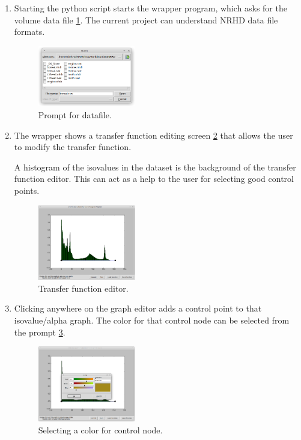 \documentclass[letterpaper,11pt]{report}
\begin{document}
\begin{enumerate}
    \item
    Starting the python script starts the wrapper program, which asks for the volume data file \ref{fig:working1}. The current project can understand NRHD data file formats.

    \begin{figure}[h!]
     \centering
      \includegraphics[width=0.4\textwidth]{working1.png}
      \caption{Prompt for datafile.}
      \label{fig:working1}
     \end{figure}

    \item
    The wrapper shows a transfer function editing screen \ref{fig:working2} that allows the user to modify the transfer function.

    A histogram of the isovalues in the dataset is the background of the transfer function editor. This can act as a help to the user for selecting good control points.

    \begin{figure}[h!]
     \centering
      \includegraphics[width=0.4\textwidth]{working2.png}
      \caption{Transfer function editor.}
      \label{fig:working2}
     \end{figure}

    \item
    Clicking anywhere on the graph editor adds a control point to that isovalue/alpha graph. The color for that control node can be selected from the prompt \ref{fig:working3}.

    \begin{figure}[h!]
     \centering
      \includegraphics[width=0.4\textwidth]{working3.png}
      \caption{Selecting a color for control node.}
      \label{fig:working3}
     \end{figure}


\end{enumerate}
\end{document}
